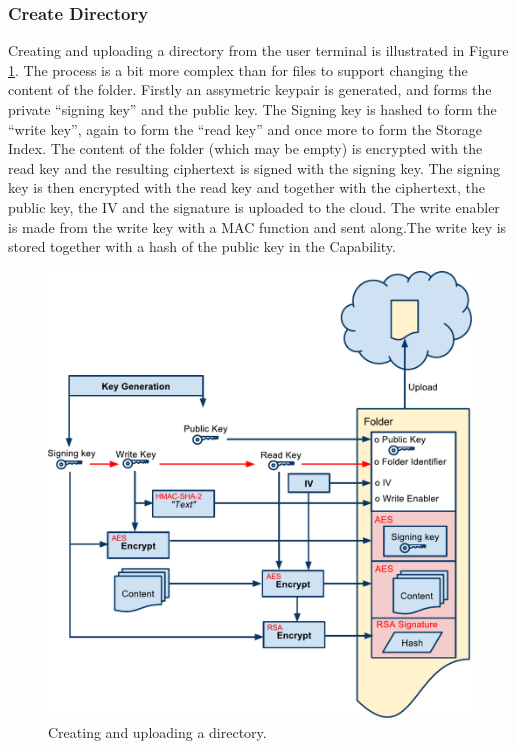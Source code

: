 \documentclass[pdftex,english,10pt,b5paper,twoside]{book}
\begin{document}
\subsubsection{Create Directory} Creating and uploading a directory from the
user terminal is illustrated in Figure \ref{fig:CS:CD}. The process is a bit
more complex than for files to support changing the content of the folder.
Firstly an assymetric keypair is generated, and forms the private ``signing
key''  and the public key. The Signing key is hashed to form the ``write key'',
again to form the ``read key'' and once more to form the Storage Index. The
content of the folder (which may be empty) is encrypted with the read key and
the resulting ciphertext is signed with the signing key. The signing key is
then encrypted with the read key and together with the ciphertext, the public
key, the IV and the signature is uploaded to the cloud. The write enabler is
made from the write key with a \ac{MAC} function and sent along.The write key
is stored together with a hash of the public key in the Capability.

\begin{figure}[h!]
    \centering
        \includegraphics[width=\columnwidth]{CryptoCreateFolder.pdf}
	    \caption{Creating and uploading a directory.}
    \label{fig:CS:CD}
\end{figure}
\end{document}
